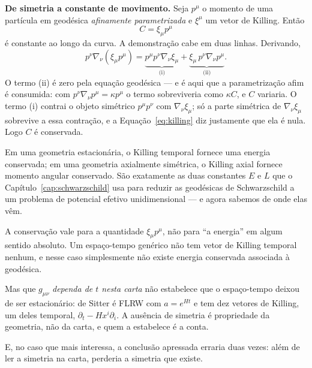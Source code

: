 \documentclass[12pt,a4paper,oneside]{book}
\theoremstyle{rgplain}
\theoremstyle{rgremark}
\begin{document}
\begin{resultado}
\textbf{De simetria a constante de movimento.} Seja $p^\mu$ o momento de uma
partícula em geodésica \emph{afinamente parametrizada} e $\xi^\mu$ um vetor
de Killing. Então
\[
  C=\xi_\mu p^\mu
\]
é constante ao longo da curva. A demonstração cabe em duas linhas. Derivando,
\[
  p^\nu\nabla_\nu(\xi_\mu p^\mu)
  =\underbrace{p^\mu p^\nu\nabla_\nu\xi_\mu}_{\text{(i)}}
  +\underbrace{\xi_\mu\,p^\nu\nabla_\nu p^\mu}_{\text{(ii)}}.
\]
O termo (ii) é zero pela equação geodésica --- e é aqui que a parametrização
afim é consumida: com $p^\nu\nabla_\nu p^\mu=\kappa p^\mu$ o termo sobreviveria
como $\kappa C$, e $C$ variaria. O termo (i) contrai o objeto
simétrico $p^\mu p^\nu$ com $\nabla_\nu\xi_\mu$; só a parte simétrica de
$\nabla_\nu\xi_\mu$ sobrevive a essa contração, e a
Equação~\eqref{eq:killing} diz justamente que ela é nula. Logo $C$ é
conservada.
\end{resultado}

Em uma geometria estacionária, o Killing temporal fornece uma energia
conservada; em uma geometria axialmente simétrica, o Killing axial fornece
momento angular conservado. São exatamente as duas constantes $E$ e $L$ que
o Capítulo~\ref{cap:schwarzschild} usa para reduzir as geodésicas de
Schwarzschild a um problema de potencial efetivo unidimensional --- e agora
sabemos de onde elas vêm.

\begin{atencao}
A conservação vale para a quantidade $\xi_\mu p^\mu$, não para ``a energia''
em algum sentido absoluto. Um espaço-tempo genérico não tem vetor de Killing
temporal nenhum, e nesse caso simplesmente não existe energia conservada
associada à geodésica.

Mas que $g_{\mu\nu}$ \emph{dependa de $t$ nesta carta} não estabelece que o
espaço-tempo deixou de ser estacionário: de Sitter é FLRW com $a=e^{Ht}$ e
tem dez vetores de Killing, um deles temporal, $\partial_t-Hx^i\partial_i$.
A ausência de simetria é propriedade da geometria, não da carta, e quem a
estabelece é a conta.
\end{atencao}

E, no caso que mais interessa, a conclusão apressada erraria duas vezes:
além de ler a simetria na carta, perderia a simetria que existe.
\end{document}
